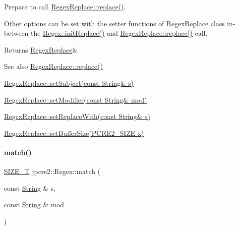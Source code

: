 Prepare to call \hyperlink{classjpcre2_1_1RegexReplace_afd087fa7a9bfedec802d1a3dd7edbdd0_afd087fa7a9bfedec802d1a3dd7edbdd0}{Regex\+Replace\+::replace()}. 

Other options can be set with the setter functions of \hyperlink{classjpcre2_1_1RegexReplace}{Regex\+Replace} class in-\/between the \hyperlink{classjpcre2_1_1Regex_ae7235a991492fa88f1bd3fb02d59cd0a_ae7235a991492fa88f1bd3fb02d59cd0a}{Regex\+::init\+Replace()} and \hyperlink{classjpcre2_1_1RegexReplace_afd087fa7a9bfedec802d1a3dd7edbdd0_afd087fa7a9bfedec802d1a3dd7edbdd0}{Regex\+Replace\+::replace()} call. \begin{DoxyReturn}{Returns}
\hyperlink{classjpcre2_1_1RegexReplace}{Regex\+Replace}\& 
\end{DoxyReturn}
\begin{DoxySeeAlso}{See also}
\hyperlink{classjpcre2_1_1RegexReplace_afd087fa7a9bfedec802d1a3dd7edbdd0_afd087fa7a9bfedec802d1a3dd7edbdd0}{Regex\+Replace\+::replace()} 

\hyperlink{classjpcre2_1_1RegexReplace_a46eefdb105827920bebc8436721fa4cb_a46eefdb105827920bebc8436721fa4cb}{Regex\+Replace\+::set\+Subject(const String\& s)} 

\hyperlink{classjpcre2_1_1RegexReplace_ae2abe2994b0fbe54950f88e63000c910_ae2abe2994b0fbe54950f88e63000c910}{Regex\+Replace\+::set\+Modifier(const String\& mod)} 

\hyperlink{classjpcre2_1_1RegexReplace_af1069f489de9b343493da2dc77b04c73_af1069f489de9b343493da2dc77b04c73}{Regex\+Replace\+::set\+Replace\+With(const String\& s)} 

\hyperlink{classjpcre2_1_1RegexReplace_a452dd2632031a13b39c13b792f18a491_a452dd2632031a13b39c13b792f18a491}{Regex\+Replace\+::set\+Buffer\+Size(\+P\+C\+R\+E2\+\_\+\+S\+I\+Z\+E x)} 
\end{DoxySeeAlso}
\hypertarget{classjpcre2_1_1Regex_ab93775a93a0a537d09b9e9ab4a5a3894_ab93775a93a0a537d09b9e9ab4a5a3894}{}\label{classjpcre2_1_1Regex_ab93775a93a0a537d09b9e9ab4a5a3894_ab93775a93a0a537d09b9e9ab4a5a3894} 
\paragraph{\texorpdfstring{match()}{match()}\hspace{0.1cm}{\footnotesize\ttfamily [1/2]}}
{\footnotesize\ttfamily \hyperlink{namespacejpcre2_a2aac465ddcb123560c7c8215dd69246c}{S\+I\+Z\+E\+\_\+T} jpcre2\+::\+Regex\+::match (\begin{DoxyParamCaption}\item[{const \hyperlink{namespacejpcre2_a91f03070152fb228bc116c5a737f1d16}{String} \&}]{s,  }\item[{const \hyperlink{namespacejpcre2_a91f03070152fb228bc116c5a737f1d16}{String} \&}]{mod }\end{DoxyParamCaption})\hspace{0.3cm}{\ttfamily [inline]}}



